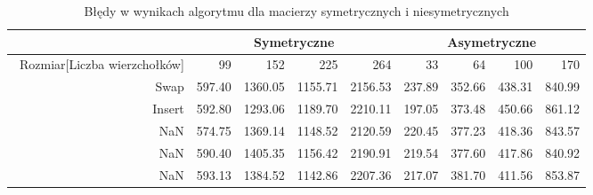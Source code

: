 \begin{table}
\begin{tabular}{|r|r|r|r|r|r|r|r|r|}
\hline
 & \multicolumn{4}{|c|}{Symetryczne} & \multicolumn{4}{|c|}{Asymetryczne} \\ \hline\
Rozmiar[Liczba wierzchołków] & 99 & 152 & 225 & 264 & 33 & 64 & 100 & 170 \\ \hline
Swap & 597.40 & 1360.05 & 1155.71 & 2156.53 & 237.89 & 352.66 & 438.31 & 840.99 \\
Insert & 592.80 & 1293.06 & 1189.70 & 2210.11 & 197.05 & 373.48 & 450.66 & 861.12 \\
NaN & 574.75 & 1369.14 & 1148.52 & 2120.59 & 220.45 & 377.23 & 418.36 & 843.57 \\
NaN & 590.40 & 1405.35 & 1156.42 & 2190.91 & 219.54 & 377.60 & 417.86 & 840.92 \\
NaN & 593.13 & 1384.52 & 1142.86 & 2207.36 & 217.07 & 381.70 & 411.56 & 853.87 \\ \hline
\end{tabular}
\caption{Błędy w wynikach algorytmu dla macierzy symetrycznych i niesymetrycznych}
\label{tab:error_AnEpoch}
\end{table}
